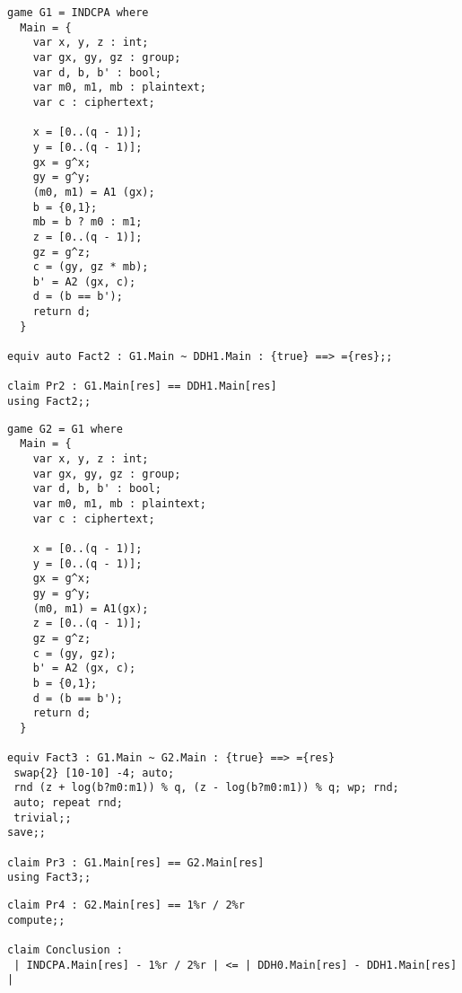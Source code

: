 \begin{verbatim}
game G1 = INDCPA where 
  Main = {
    var x, y, z : int;
    var gx, gy, gz : group;
    var d, b, b' : bool;
    var m0, m1, mb : plaintext;
    var c : ciphertext;
 
    x = [0..(q - 1)];
    y = [0..(q - 1)];
    gx = g^x;
    gy = g^y;
    (m0, m1) = A1 (gx);
    b = {0,1};
    mb = b ? m0 : m1; 
    z = [0..(q - 1)];
    gz = g^z;
    c = (gy, gz * mb);
    b' = A2 (gx, c);
    d = (b == b');
    return d;
  }

equiv auto Fact2 : G1.Main ~ DDH1.Main : {true} ==> ={res};;
 
claim Pr2 : G1.Main[res] == DDH1.Main[res] 
using Fact2;;
\end{verbatim}

\begin{verbatim}
game G2 = G1 where 
  Main = {
    var x, y, z : int;
    var gx, gy, gz : group;
    var d, b, b' : bool;
    var m0, m1, mb : plaintext;
    var c : ciphertext;
 
    x = [0..(q - 1)];
    y = [0..(q - 1)];
    gx = g^x;
    gy = g^y;
    (m0, m1) = A1(gx);
    z = [0..(q - 1)];
    gz = g^z;
    c = (gy, gz); 
    b' = A2 (gx, c);
    b = {0,1};
    d = (b == b');
    return d;
  }

equiv Fact3 : G1.Main ~ G2.Main : {true} ==> ={res} 
 swap{2} [10-10] -4; auto;
 rnd (z + log(b?m0:m1)) % q, (z - log(b?m0:m1)) % q; wp; rnd; 
 auto; repeat rnd;
 trivial;;
save;;

claim Pr3 : G1.Main[res] == G2.Main[res]
using Fact3;;
\end{verbatim}

\begin{verbatim}
claim Pr4 : G2.Main[res] == 1%r / 2%r
compute;;

claim Conclusion : 
 | INDCPA.Main[res] - 1%r / 2%r | <= | DDH0.Main[res] - DDH1.Main[res] | 
\end{verbatim}

